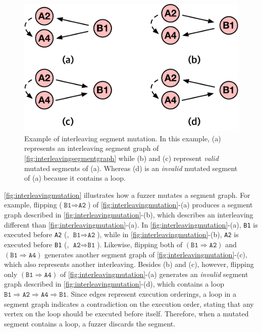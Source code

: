 \begin{figure}[t]
  \centering
  \includegraphics[width=0.7\linewidth]{fig/interleavingmutation.pdf}
  \caption{Example of interleaving segment mutation. In this example,
    (a) represents an interleaving segment graph of
    \autoref{fig:interleavingsegmentgraph} while (b) and (c) represent
    \textit{valid} mutated segments of (a). Whereas (d) is an
    \textit{invalid} mutated segment of (a) because it contains a
    loop.}
  \label{fig:interleavingmutation}
\end{figure}
%
\autoref{fig:interleavingmutation} illustrates how a fuzzer mutates a
segment graph.
%
For example, flipping ($\texttt{B1} \Rightarrow \texttt{A2}$) of
\autoref{fig:interleavingmutation}-(a) produces a segment graph
described in \autoref{fig:interleavingmutation}-(b), which describes
an interleaving different than \autoref{fig:interleavingmutation}-(a).
%
In \autoref{fig:interleavingmutation}-(a), \texttt{B1} is executed
before \texttt{A2} (\ie, $\texttt{B1} \Rightarrow \texttt{A2}$), while
in \autoref{fig:interleavingmutation}-(b), \texttt{A2} is executed
before \texttt{B1} (\ie, $\texttt{A2} \Rightarrow \texttt{B1}$).
%
Likewise, flipping both of $(\texttt{B1} \Rightarrow \texttt{A2})$ and
$(\texttt{B1} \Rightarrow \texttt{A4})$ generates another segment
graph of \autoref{fig:interleavingmutation}-(c), which also represents
another interleaving.
%
Besides (b) and (c), however, flipping only
$(\texttt{B1} \Rightarrow \texttt{A4})$ of
\autoref{fig:interleavingmutation}-(a) generates an \textit{invalid}
segment graph described in \autoref{fig:interleavingmutation}-(d),
which contains a loop
$\texttt{B1} \Rightarrow \texttt{A2} \Rightarrow \texttt{A4}
\Rightarrow \texttt{B1}$.
%
Since edges represent execution orderings, a loop in a segment graph
indicates a contradiction on the execution order, stating that any
vertex on the loop should be executed before itself. Therefore, when a
mutated segment contains a loop, a fuzzer discards the segment.
%


